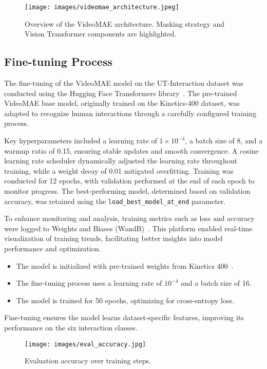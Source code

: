 \documentclass[runningheads]{llncs}
\begin{document}
\begin{figure}[ht]
	\centering
	\texttt{[image: images/videomae\_architecture.jpeg]}
	\caption{Overview of the VideoMAE architecture. Masking strategy and Vision Transformer components are highlighted.}
	\label{fig:videomae}
\end{figure}

	
\subsection{Fine-tuning Process} \label{sec:finetuning}
The fine-tuning of the VideoMAE model on the UT-Interaction dataset was conducted using the Hugging Face Transformers library~\cite{hf_transformers}. The pre-trained VideoMAE base model, originally trained on the Kinetics-400 dataset, was adapted to recognize human interactions through a carefully configured training process.

Key hyperparameters included a learning rate of $1\times10^{-4}$, a batch size of 8, and a warmup ratio of 0.15, ensuring stable updates and smooth convergence. A cosine learning rate scheduler dynamically adjusted the learning rate throughout training, while a weight decay of 0.01 mitigated overfitting. Training was conducted for 12 epochs, with validation performed at the end of each epoch to monitor progress. The best-performing model, determined based on validation accuracy, was retained using the \texttt{load\_best\_model\_at\_end} parameter.


To enhance monitoring and analysis, training metrics such as loss and accuracy were logged to Weights and Biases (WandB)~\cite{wandb}. This platform enabled real-time visualization of training trends, facilitating better insights into model performance and optimization.

	\begin{itemize}
		\item The model is initialized with pre-trained weights from Kinetics 400~\cite{kinetics400}.
		\item The fine-tuning process uses a learning rate of $10^{-4}$ and a batch size of 16.
		\item The model is trained for 50 epochs, optimizing for cross-entropy loss.
	\end{itemize}
	Fine-tuning ensures the model learns dataset-specific features, improving its performance on the six interaction classes.
	\begin{figure}[ht]
		\centering
		\texttt{[image: images/eval\_accuracy.jpg]}
		\caption{Evaluation accuracy over training steps.}
		\label{fig:eval_accuracy}
	\end{figure}
	
\end{document}
